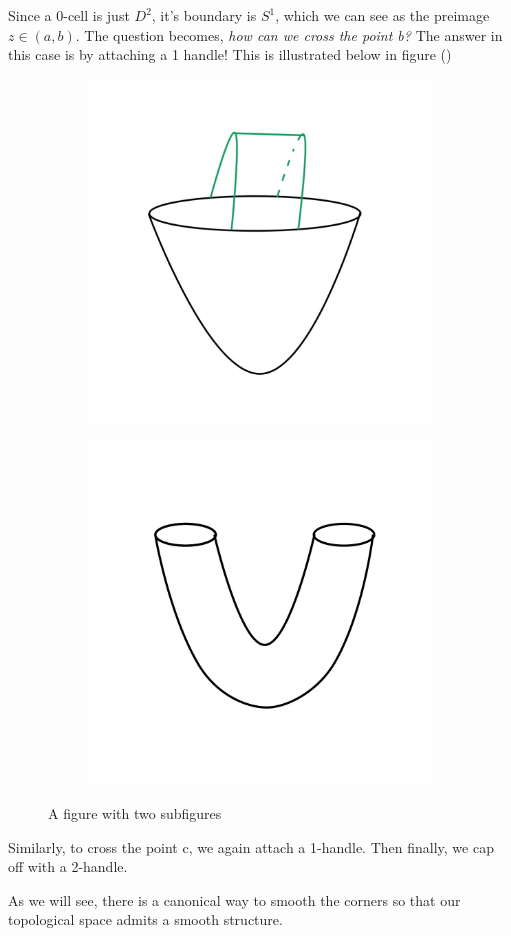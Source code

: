 \begin{example}
Since a 0-cell is just $D^{2}$, it's boundary is $S^{1}$, which we can see as the preimage $z\in (a,b)$. The question becomes, \textit{how can we cross the point b?} The answer in this case is by attaching a 1 handle! This is illustrated below in figure ()
\begin{figure}
\centering
\begin{subfigure}{.7\textwidth}
  \centering
  \includegraphics[width=.4\linewidth]{Images_Lect1/1handle.jpeg}
\end{subfigure}%
\begin{subfigure}{.7\textwidth}
  \centering
  \includegraphics[width=.4\linewidth]{Images_Lect1/1handle1.jpeg}
\end{subfigure}
\caption{A figure with two subfigures}
\label{fig:test}
\end{figure}

Similarly, to cross the point c, we again attach a 1-handle. Then finally, we cap off with a 2-handle.
\end{example}
\begin{remark}
As we will see, there is a canonical way to smooth the corners so that our topological space admits a smooth structure.
\end{remark}

